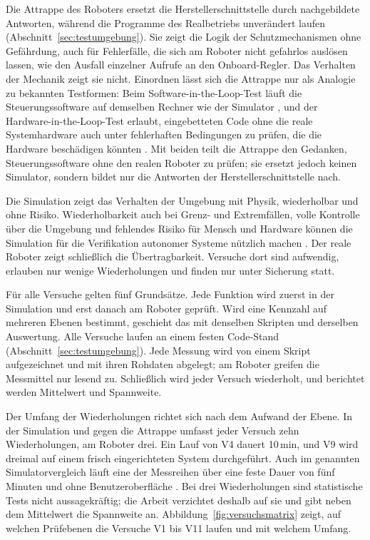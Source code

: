 Die Attrappe des Roboters ersetzt die Herstellerschnittstelle durch nachgebildete Antworten, während die Programme des Realbetriebs unverändert laufen (Abschnitt~\ref{sec:testumgebung}).
Sie zeigt die Logik der Schutzmechanismen ohne Gefährdung, auch für Fehlerfälle, die sich am Roboter nicht gefahrlos auslösen lassen, wie den Ausfall einzelner Aufrufe an den Onboard-Regler.
Das Verhalten der Mechanik zeigt sie nicht.
Einordnen lässt sich die Attrappe nur als Analogie zu bekannten Testformen: Beim Software-in-the-Loop-Test läuft die Steuerungssoftware auf demselben Rechner wie der Simulator \cite{Afzal2021}, und der Hardware-in-the-Loop-Test erlaubt, eingebetteten Code ohne die reale Systemhardware auch unter fehlerhaften Bedingungen zu prüfen, die die Hardware beschädigen könnten \cite{Mihalic2022}.
Mit beiden teilt die Attrappe den Gedanken, Steuerungssoftware ohne den realen Roboter zu prüfen; sie ersetzt jedoch keinen Simulator, sondern bildet nur die Antworten der Herstellerschnittstelle nach.

Die Simulation zeigt das Verhalten der Umgebung mit Physik, wiederholbar und ohne Risiko.
Wiederholbarkeit auch bei Grenz- und Extremfällen, volle Kontrolle über die Umgebung und fehlendes Risiko für Mensch und Hardware können die Simulation für die Verifikation autonomer Systeme nützlich machen \cite{Choi2021}.
Der reale Roboter zeigt schließlich die Übertragbarkeit.
Versuche dort sind aufwendig, erlauben nur wenige Wiederholungen und finden nur unter Sicherung statt.

Für alle Versuche gelten fünf Grundsätze.
Jede Funktion wird zuerst in der Simulation und erst danach am Roboter geprüft.
Wird eine Kennzahl auf mehreren Ebenen bestimmt, geschieht das mit denselben Skripten und derselben Auswertung.
Alle Versuche laufen an einem festen Code-Stand (Abschnitt~\ref{sec:testumgebung}).
Jede Messung wird von einem Skript aufgezeichnet und mit ihren Rohdaten abgelegt; am Roboter greifen die Messmittel nur lesend zu.
Schließlich wird jeder Versuch wiederholt, und berichtet werden Mittelwert und Spannweite.

Der Umfang der Wiederholungen richtet sich nach dem Aufwand der Ebene.
In der Simulation und gegen die Attrappe umfasst jeder Versuch zehn Wiederholungen, am Roboter drei.
Ein Lauf von V4 dauert 10\,min, und V9 wird dreimal auf einem frisch eingerichteten System durchgeführt.
Auch im genannten Simulatorvergleich läuft eine der Messreihen über eine feste Dauer von fünf Minuten und ohne Benutzeroberfläche \cite{Pitonakova2018}.
Bei drei Wiederholungen sind statistische Tests nicht aussagekräftig; die Arbeit verzichtet deshalb auf sie und gibt neben dem Mittelwert die Spannweite an.
Abbildung~\ref{fig:versuchsmatrix} zeigt, auf welchen Prüfebenen die Versuche V1 bis V11 laufen und mit welchem Umfang.

